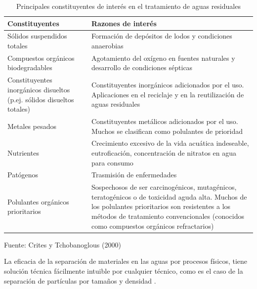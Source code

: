 	\begin{table}[!ht]
	\begin{small}	
	\caption{Principales constituyentes de interés en el tratamiento de aguas residuales}\label{tab:constituyentes}
	\begin{center}
		\begin{tabular}{ | m{5cm} | m{10cm} | }
		\hline 
		\rowcolor{blanc}
		{\textbf{Constituyentes}} & {\textbf{Razones de interés}}\\ 
		\hline 
		Sólidos suspendidos totales & Formación de depósitos de lodos y condiciones anaerobias\par \\ 
		
		Compuestos orgánicos biodegradables & Agotamiento del oxígeno en fuentes naturales y desarrollo de condiciones sépticas\par \\
		
		Constituyentes inorgánicos disueltos (p.ej. sólidos disueltos totales) & Constituyentes inorgánicos adicionados por el uso. Aplicaciones en el reciclaje y en la reutilización de aguas residuales\par \\
		
		Metales pesados & Constituyentes metálicos adicionados por el uso. Muchos se clasifican como polulantes de prioridad\par \\
		
		Nutrientes & Crecimiento excesivo de la vida acuática indeseable, eutroficación, concentración de nitratos en agua para consumo\par \\
		
		Patógenos & Trasmisión de enfermedades\par \\
		
		Polulantes orgánicos prioritarios & Sospechosos de ser carcinogénicos, mutagénicos, teratogénicos o de toxicidad aguda alta. Muchos de los polulantes prioritarios son resistentes a los métodos de tratamiento convencionales (conocidos como compuestos orgánicos refractarios)\\
		\hline
		\end{tabular}
		{\small{Fuente: Crites y Tchobanoglous (2000)}}
	\end{center}
	\end{small}
	\end{table}
La eficacia de la separación de materiales en las aguas por procesos físicos, tiene solución técnica fácilmente intuible por cualquier técnico, como es el caso de la separación de partículas por tamaños y densidad \citep{manuel13}.\par
